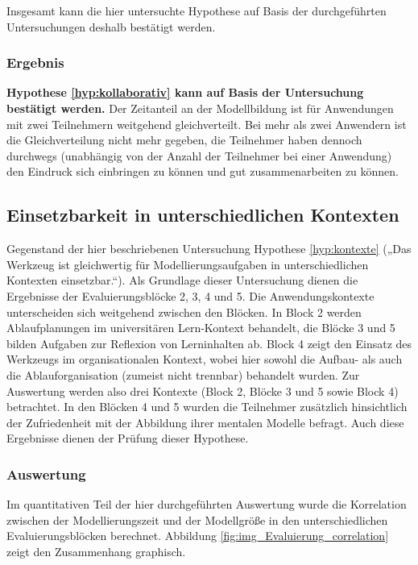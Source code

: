 Insgesamt kann die hier untersuchte Hypothese auf Basis der durchgeführten Untersuchungen deshalb bestätigt werden.

\subsubsection{Ergebnis} %

\textbf{Hypothese \ref{hyp:kollaborativ} kann auf Basis der Untersuchung bestätigt werden.} Der Zeitanteil an der Modellbildung ist für Anwendungen mit zwei Teilnehmern weitgehend gleichverteilt. Bei mehr als zwei Anwendern ist die Gleichverteilung nicht mehr gegeben, die Teilnehmer haben dennoch durchwegs (unabhängig von der Anzahl der Teilnehmer bei einer Anwendung) den Eindruck sich einbringen zu können und gut zusammenarbeiten zu können.


\subsection{Einsetzbarkeit in unterschiedlichen Kontexten} %
\label{sub:einsetzbarkeit_in_unterschiedlichen_kontexten}

Gegenstand der hier beschriebenen Untersuchung Hypothese \ref{hyp:kontexte} („Das Werkzeug ist gleichwertig für Modellierungsaufgaben in unterschiedlichen Kontexten einsetzbar.“). Als Grundlage dieser Untersuchung dienen die Ergebnisse der Evaluierungsblöcke 2, 3, 4 und 5. Die Anwendungskontexte unterscheiden sich weitgehend zwischen den Blöcken. In Block 2 werden Ablaufplanungen im universitären Lern-Kontext behandelt, die Blöcke 3 und 5 bilden Aufgaben zur Reflexion von Lerninhalten ab. Block 4 zeigt den Einsatz des Werkzeugs im organisationalen Kontext, wobei hier sowohl die Aufbau- als auch die Ablauforganisation (zumeist nicht trennbar) behandelt wurden. Zur Auswertung werden also drei Kontexte (Block 2, Blöcke 3 und 5 sowie Block 4) betrachtet. In den Blöcken 4 und 5 wurden die Teilnehmer zusätzlich hinsichtlich der Zufriedenheit mit der Abbildung ihrer mentalen Modelle befragt. Auch diese Ergebnisse dienen der Prüfung dieser Hypothese.

\subsubsection{Auswertung} 

Im quantitativen Teil der hier durchgeführten Auswertung wurde die Korrelation zwischen der Modellierungszeit und der Modellgröße in den unterschiedlichen Evaluierungsblöcken berechnet. Abbildung \ref{fig:img_Evaluierung_correlation} zeigt den Zusammenhang graphisch.

